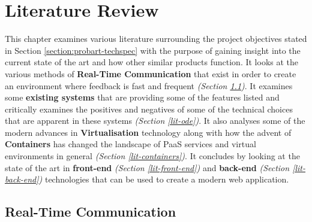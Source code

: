 
\chapter{Literature Review} \label{lit}

This chapter examines various literature surrounding the project objectives stated in Section \ref{section:probart-techspec} with the purpose of gaining insight into the current state of the art and how other similar products function. It looks at the various methods of \textbf{Real-Time Communication} that exist in order to create an environment where feedback is fast and frequent \textit{(Section \ref{lit-rtc})}. It examines some \textbf{existing systems} that are providing some of the features listed and critically examines the positives and negatives of some of the technical choices that are apparent in these systems \textit{(Section \ref{lit-ode})}. It also analyses some of the modern advances in \textbf{Virtualisation} technology along with how the advent of \textbf{Containers} has changed the landscape of PaaS services and virtual environments in general \textit{(Section \ref{lit-containers})}. It concludes by looking at the state of the art in \textbf{front-end} \textit{(Section \ref{lit-front-end})} and \textbf{back-end} \textit{(Section \ref{lit-back-end})} technologies that can be used to create a modern web application. 

\section{Real-Time Communication} \label{lit-rtc}

